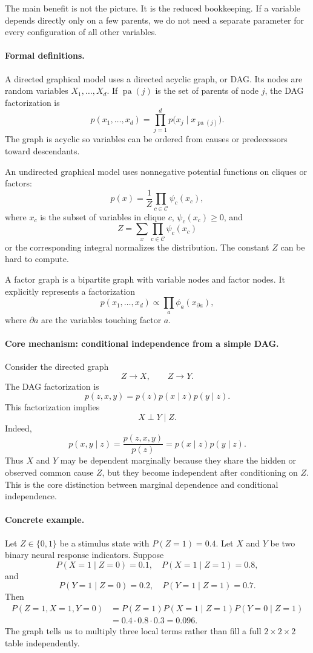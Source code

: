The main benefit is not the picture. It is the reduced bookkeeping. If a variable depends directly only on a few parents, we do not need a separate parameter for every configuration of all other variables.

\paragraph{Formal definitions.}
A directed graphical model uses a directed acyclic graph, or DAG. Its nodes are random variables \(X_1,\ldots,X_d\). If \(\operatorname{pa}(j)\) is the set of parents of node \(j\), the DAG factorization is
\[
\boxed{
p(x_1,\ldots,x_d)
=\prod_{j=1}^d p\bigl(x_j\mid x_{\operatorname{pa}(j)}\bigr).
}
\]
The graph is acyclic so variables can be ordered from causes or predecessors toward descendants.

An undirected graphical model uses nonnegative potential functions on cliques or factors:
\[
\boxed{
p(x)=\frac{1}{Z}\prod_{c\in\mathcal C}\psi_c(x_c),
}
\]
where \(x_c\) is the subset of variables in clique \(c\), \(\psi_c(x_c)\geq0\), and
\[
Z=\sum_x \prod_{c\in\mathcal C}\psi_c(x_c)
\]
or the corresponding integral normalizes the distribution. The constant \(Z\) can be hard to compute.

A factor graph is a bipartite graph with variable nodes and factor nodes. It explicitly represents a factorization
\[
p(x_1,\ldots,x_d)\propto\prod_a \phi_a(x_{\partial a}),
\]
where \(\partial a\) are the variables touching factor \(a\).

\paragraph{Core mechanism: conditional independence from a simple DAG.}
Consider the directed graph
\[
Z\to X,\qquad Z\to Y.
\]
The DAG factorization is
\[
\boxed{
p(z,x,y)=p(z)p(x\mid z)p(y\mid z).
}
\]
This factorization implies
\[
X\perp Y\mid Z.
\]
Indeed,
\[
p(x,y\mid z)
=\frac{p(z,x,y)}{p(z)}
=p(x\mid z)p(y\mid z).
\]
Thus \(X\) and \(Y\) may be dependent marginally because they share the hidden or observed common cause \(Z\), but they become independent after conditioning on \(Z\). This is the core distinction between marginal dependence and conditional independence.

\paragraph{Concrete example.}
Let \(Z\in\{0,1\}\) be a stimulus state with \(P(Z=1)=0.4\). Let \(X\) and \(Y\) be two binary neural response indicators. Suppose
\[
P(X=1\mid Z=0)=0.1,\quad P(X=1\mid Z=1)=0.8,
\]
and
\[
P(Y=1\mid Z=0)=0.2,\quad P(Y=1\mid Z=1)=0.7.
\]
Then
\[
\begin{aligned}
P(Z=1,X=1,Y=0)
&=P(Z=1)P(X=1\mid Z=1)P(Y=0\mid Z=1)\\
&=0.4\cdot0.8\cdot0.3=0.096.
\end{aligned}
\]
The graph tells us to multiply three local terms rather than fill a full \(2\times2\times2\) table independently.

